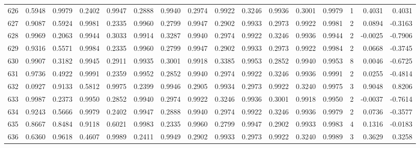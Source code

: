\begin{tabular}{lrrrrrrrrrrrrrrr}
626 &      0.5948 &  0.9979 &  0.2402 &  0.9947 &  0.2888 &  0.9940 &  0.2974 &  0.9922 &  0.3246 &  0.9936 &   0.3001 &     0.9979 &      1 &                    0.4031 &                     0.4031 \\
627 &      0.9087 &  0.5924 &  0.9981 &  0.2335 &  0.9960 &  0.2799 &  0.9947 &  0.2902 &  0.9933 &  0.2973 &   0.9922 &     0.9981 &      2 &                    0.0894 &                    -0.3163 \\
628 &      0.9969 &  0.2063 &  0.9944 &  0.3033 &  0.9914 &  0.3287 &  0.9940 &  0.2974 &  0.9922 &  0.3246 &   0.9936 &     0.9944 &      2 &                   -0.0025 &                    -0.7906 \\
629 &      0.9316 &  0.5571 &  0.9984 &  0.2335 &  0.9960 &  0.2799 &  0.9947 &  0.2902 &  0.9933 &  0.2973 &   0.9922 &     0.9984 &      2 &                    0.0668 &                    -0.3745 \\
630 &      0.9907 &  0.3182 &  0.9945 &  0.2911 &  0.9935 &  0.3001 &  0.9918 &  0.3385 &  0.9953 &  0.2852 &   0.9940 &     0.9953 &      8 &                    0.0046 &                    -0.6725 \\
631 &      0.9736 &  0.4922 &  0.9991 &  0.2359 &  0.9952 &  0.2852 &  0.9940 &  0.2974 &  0.9922 &  0.3246 &   0.9936 &     0.9991 &      2 &                    0.0255 &                    -0.4814 \\
632 &      0.0927 &  0.9133 &  0.5812 &  0.9975 &  0.2399 &  0.9946 &  0.2905 &  0.9934 &  0.2973 &  0.9922 &   0.3240 &     0.9975 &      3 &                    0.9048 &                     0.8206 \\
633 &      0.9987 &  0.2373 &  0.9950 &  0.2852 &  0.9940 &  0.2974 &  0.9922 &  0.3246 &  0.9936 &  0.3001 &   0.9918 &     0.9950 &      2 &                   -0.0037 &                    -0.7614 \\
634 &      0.9243 &  0.5666 &  0.9979 &  0.2402 &  0.9947 &  0.2888 &  0.9940 &  0.2974 &  0.9922 &  0.3246 &   0.9936 &     0.9979 &      2 &                    0.0736 &                    -0.3577 \\
635 &      0.8667 &  0.8484 &  0.9118 &  0.6021 &  0.9983 &  0.2335 &  0.9960 &  0.2799 &  0.9947 &  0.2902 &   0.9933 &     0.9983 &      4 &                    0.1316 &                    -0.0183 \\
636 &      0.6360 &  0.9618 &  0.4607 &  0.9989 &  0.2411 &  0.9949 &  0.2902 &  0.9933 &  0.2973 &  0.9922 &   0.3240 &     0.9989 &      3 &                    0.3629 &                     0.3258 \\

\end{tabular}
